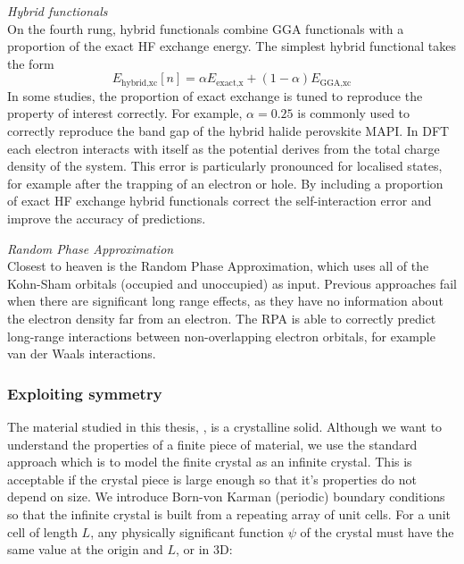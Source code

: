\textit{Hybrid functionals} \\
On the fourth rung, hybrid functionals combine GGA functionals with a proportion of the exact HF exchange energy. The simplest hybrid functional takes the form
$$
E_{\textrm{hybrid,xc}}\left[n\right] = \alpha E_{\textrm{exact,x}} + \left(1-\alpha\right)E_{\textrm{GGA,xc}}
$$
In some studies, the proportion of exact exchange is tuned to reproduce the property of interest correctly. For example, $\alpha=0.25$ is commonly used to correctly reproduce the band gap of the hybrid halide perovskite MAPI.%
In DFT each electron interacts with itself as the potential derives from the total charge density of the system. This error is particularly pronounced for localised states, for example after the trapping of an electron or hole. By including a proportion of exact HF exchange hybrid functionals correct the self-interaction error and improve the accuracy of predictions.

\textit{Random Phase Approximation} \\
Closest to heaven is the Random Phase Approximation, which uses all of the Kohn-Sham orbitals (occupied and unoccupied) as input. Previous approaches fail when there are significant long range effects, as they have no information about the electron density far from an electron. The RPA is able to correctly predict long-range interactions between non-overlapping electron orbitals, for example van der Waals interactions.


\subsubsection{Exploiting symmetry}

The material studied in this thesis, , is a crystalline solid. Although we want to understand the properties of a finite piece of material, we use the standard approach which is to model the finite crystal as an infinite crystal. This is acceptable if the crystal piece is large enough so that it's properties do not depend on size. We introduce Born-von Karman (periodic) boundary conditions so that the infinite crystal is built from a repeating array of unit cells. For a unit cell of length $L$, any physically significant function $\psi$ of the crystal must have the same value at the origin and $L$, or in 3D:

